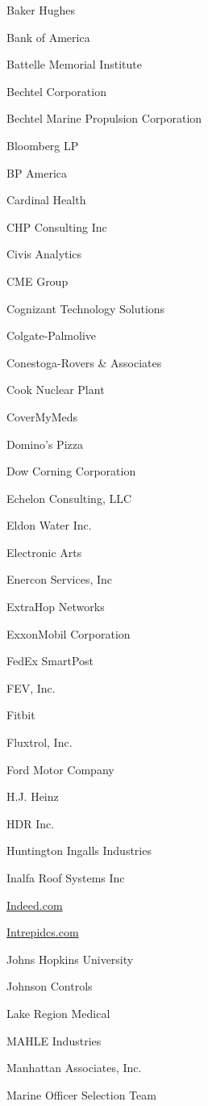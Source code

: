 \documentclass[twoside]{article}
\begin{document}
\begin{center}
\begin{multicols}{5}
\begin{FlushLeft}
\begin{compactitem}
\item Baker Hughes
\item Bank of America
\item Battelle Memorial Institute
\item Bechtel Corporation
\item Bechtel Marine Propulsion Corporation
\item Bloomberg LP
\item BP America
\item Cardinal Health
\item CHP Consulting Inc
\item Civis Analytics
\item CME Group
\item Cognizant Technology Solutions
\item Colgate-Palmolive
\item Conestoga-Rovers \& Associates
\item Cook Nuclear Plant
\item CoverMyMeds
\item Domino's Pizza
\item Dow Corning Corporation
\item Echelon Consulting, LLC
\item Eldon Water Inc.
\item Electronic Arts
\item Enercon Services, Inc
\item ExtraHop Networks
\item ExxonMobil Corporation
\item FedEx SmartPost
\item FEV, Inc.
\item Fitbit
\item Fluxtrol, Inc.
\item Ford Motor Company
\item H.J. Heinz
\item HDR Inc.
\item Huntington Ingalls Industries
\item Inalfa Roof Systems Inc
\item \url{Indeed.com}
\item \url{Intrepidcs.com}
\item Johns Hopkins University
\item Johnson Controls
\item Lake Region Medical
\item MAHLE Industries
\item Manhattan Associates, Inc.
\item Marine Officer Selection Team

\end{compactitem}
\end{FlushLeft}
\end{multicols}
\end{center}
\end{document}
